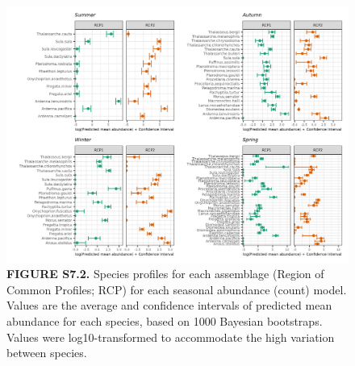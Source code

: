 \documentclass[
]{article}
\begin{document}
\begin{landscape}
\newpage

\begin{figure}
\centering
\includegraphics{../results/FigS7_2_spp-profiles-NegBin.png}
\caption{\textbf{FIGURE S7.2.} Species profiles for each assemblage
(Region of Common Profiles; RCP) for each seasonal abundance (count)
model. Values are the average and confidence intervals of predicted mean
abundance for each species, based on 1000 Bayesian bootstraps. Values
were log10-transformed to accommodate the high variation between
species.}
\end{figure}

\end{landscape}

\newpage
\end{document}
